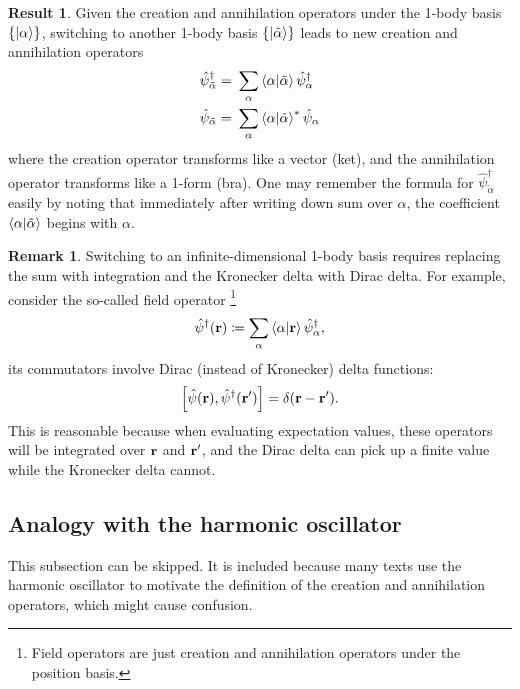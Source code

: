 \documentclass{article}
\theoremstyle{definition}
\newtheorem{res}{Result}[section]
\newtheorem{rem}{Remark}[section]
\theoremstyle{plain}
\numberwithin{equation}{section}
\begin{document}
\begin{graybox}
\begin{res}
    Given the creation and annihilation operators 
    under the 1-body basis $\{\ket{\alpha}\}$, 
    switching to another 1-body basis 
    $\{\ket{\tilde{\alpha}}\}$ leads to new 
    creation and annihilation operators 
    \begin{align*}
    \hat{\psi}^{\dagger}_{\tilde{\alpha}}
    =&\ 
    \sum_{\alpha}\bra{\alpha}\ket{\tilde{\alpha}}
    \hat{\psi}^{\dagger}_{\alpha} \\
    \hat{\psi}_{\tilde{\alpha}}
    =&\ 
    \sum_{\alpha}\bra{\alpha}\ket{\tilde{\alpha}} ^{*} \hat{\psi}_{\alpha}
    \end{align*}
    where the creation operator 
    transforms like a vector (ket), 
    and the annihilation operator 
    transforms like a 1-form (bra). 
    One may remember the formula for 
    $\hat{\psi}^{\dagger}_{\tilde{\alpha}}$ easily by noting that 
    immediately after writing down sum over $\alpha$, 
    the coefficient $\bra{\alpha}\ket{\tilde{\alpha}}$ 
    begins with $\alpha$.
\end{res}
\end{graybox}

\begin{rem}
    Switching to an infinite-dimensional 1-body basis 
    requires replacing the sum 
    with integration and 
    the Kronecker delta with 
    Dirac delta. 
    For example, 
    consider the so-called field operator
    \footnote{
        Field operators are just creation and annihilation operators 
        under the position basis.
    }
    \[
        \hat{\psi}^{\dagger}(\vb{r})
        \coloneqq
        \sum_{\alpha}\bra{\alpha}\ket{\vb{r}}
        \hat{\psi}^{\dagger}_{\alpha},
    \]
    its commutators involve Dirac (instead of Kronecker) delta functions: 
    \[
        \comm{\hat{\psi}(\vb{r})}{\hat{\psi}^{\dagger}(\vb{r'})}
        =
        \delta(\vb{r}-\vb{r'}).
    \]
    This is reasonable because 
    when evaluating expectation values, 
    these operators will be integrated over $\vb{r}$ and $\vb{r'}$, and 
    the Dirac delta can pick up a finite value while 
    the Kronecker delta cannot.
\end{rem}

\subsection{Analogy with the harmonic oscillator}

This subsection 
can be skipped. 
It is included because many texts use the 
harmonic oscillator to motivate the definition of 
the creation and annihilation operators, which 
might cause confusion.
\end{document}
